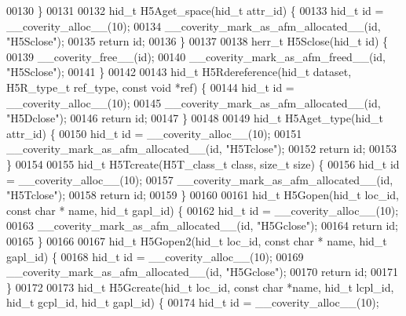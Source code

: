\begin{DoxyCode}
00130 \}
00131 
00132 hid\_t H5Aget\_space(hid\_t attr\_id) \{
00133     hid\_t \textcolor{keywordtype}{id} = \_\_coverity\_alloc\_\_(10);
00134     \_\_coverity\_mark\_as\_afm\_allocated\_\_(\textcolor{keywordtype}{id}, \textcolor{stringliteral}{"H5Sclose"});
00135     \textcolor{keywordflow}{return} id;
00136 \}
00137 
00138 herr\_t H5Sclose(hid\_t \textcolor{keywordtype}{id}) \{
00139     \_\_coverity\_free\_\_(\textcolor{keywordtype}{id});
00140     \_\_coverity\_mark\_as\_afm\_freed\_\_(\textcolor{keywordtype}{id}, \textcolor{stringliteral}{"H5Sclose"});
00141 \}
00142 
00143 hid\_t H5Rdereference(hid\_t dataset, H5R\_type\_t ref\_type, \textcolor{keyword}{const} \textcolor{keywordtype}{void} *ref) \{
00144     hid\_t \textcolor{keywordtype}{id} = \_\_coverity\_alloc\_\_(10);
00145     \_\_coverity\_mark\_as\_afm\_allocated\_\_(\textcolor{keywordtype}{id}, \textcolor{stringliteral}{"H5Dclose"});
00146     \textcolor{keywordflow}{return} id;
00147 \}
00148 
00149 hid\_t H5Aget\_type(hid\_t attr\_id) \{
00150     hid\_t \textcolor{keywordtype}{id} = \_\_coverity\_alloc\_\_(10);
00151     \_\_coverity\_mark\_as\_afm\_allocated\_\_(\textcolor{keywordtype}{id}, \textcolor{stringliteral}{"H5Tclose"});
00152     \textcolor{keywordflow}{return} id;
00153 \}
00154 
00155 hid\_t H5Tcreate(H5T\_class\_t \textcolor{keyword}{class}, \textcolor{keywordtype}{size\_t} size) \{
00156     hid\_t \textcolor{keywordtype}{id} = \_\_coverity\_alloc\_\_(10);
00157     \_\_coverity\_mark\_as\_afm\_allocated\_\_(\textcolor{keywordtype}{id}, \textcolor{stringliteral}{"H5Tclose"});
00158     \textcolor{keywordflow}{return} id;
00159 \}
00160 
00161 hid\_t H5Gopen(hid\_t loc\_id, \textcolor{keyword}{const} \textcolor{keywordtype}{char} * name, hid\_t gapl\_id) \{
00162     hid\_t \textcolor{keywordtype}{id} = \_\_coverity\_alloc\_\_(10);
00163     \_\_coverity\_mark\_as\_afm\_allocated\_\_(\textcolor{keywordtype}{id}, \textcolor{stringliteral}{"H5Gclose"});
00164     \textcolor{keywordflow}{return} id;
00165 \}
00166 
00167 hid\_t H5Gopen2(hid\_t loc\_id, \textcolor{keyword}{const} \textcolor{keywordtype}{char} * name, hid\_t gapl\_id) \{
00168     hid\_t \textcolor{keywordtype}{id} = \_\_coverity\_alloc\_\_(10);
00169     \_\_coverity\_mark\_as\_afm\_allocated\_\_(\textcolor{keywordtype}{id}, \textcolor{stringliteral}{"H5Gclose"});
00170     \textcolor{keywordflow}{return} id;
00171 \}
00172 
00173 hid\_t H5Gcreate(hid\_t loc\_id, \textcolor{keyword}{const} \textcolor{keywordtype}{char} *name, hid\_t lcpl\_id, hid\_t gcpl\_id, hid\_t gapl\_id) \{
00174     hid\_t \textcolor{keywordtype}{id} = \_\_coverity\_alloc\_\_(10);

\end{DoxyCode}
